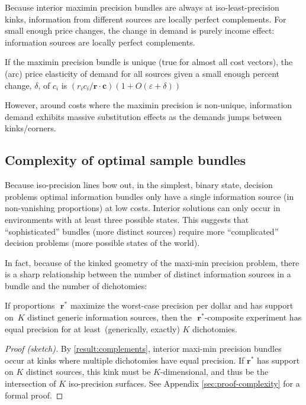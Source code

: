 \documentclass{fancyArticle}
\renewcommand{\|}{\,|\,}                    %
\providecommand{\;}{\,;}                    %
\begin{document}
Because interior maximin precision bundles are always at iso-least-precision kinks, information from different sources are locally perfect complements.
For small enough price changes, the change in demand is purely income effect: information sources are locally perfect complements.
\begin{corollary*}
  If the maximin precision bundle is unique (true for almost all cost vectors), the (arc) price elasticity of demand for all sources given a small enough percent change, $\delta$, of $c_i$ is
  $( r_{i}c_i / \mathbf{r} \cdot \mathbf{c} )\left( 1 + O \left( \varepsilon + \delta \right) \right)$
\end{corollary*}
However, around costs where the maximin precision is non-unique, information demand exhibits massive substitution effects as the demands jumps between kinks/corners.


\subsection{Complexity of optimal sample bundles}
\label{sec:complex-bundles}

Because iso-precision lines bow out, in the simplest, binary state, decision problems optimal information bundles only have a single information source (in non-vanishing proportions) at low costs.
Interior solutions can only occur in environments with at least three possible states.
This suggests that ``sophisticated'' bundles (more distinct sources) require more ``complicated'' decision problems (more possible states of the world).

In fact, because of the kinked geometry of the maxi-min precision problem,  there is a sharp relationship between the number of distinct information sources in a bundle and the number of dichotomies:

\begin{proposition}\label{result:complexity}
  If proportions\ \,$\mathbf{r}^{*}$ maximize the worst-case precision per dollar and has support on\ $K$ distinct generic information sources, then the\ \,$\mathbf{r}^{*}$-composite experiment has equal precision for at least\ (generically, exactly) $K$ dichotomies.
\end{proposition}

\begin{proof}[Proof (sketch)]
  By \autoref{result:complements}, interior maxi-min precision bundles occur at kinks where multiple dichotomies have equal precision.
  If $\mathbf{r}^{*}$ has support on $K$ distinct sources, this kink must be $K$-dimensional, and thus be the intersection of $K$ iso-precision surfaces.
  See Appendix \ref{sec:proof-complexity} for a formal proof.
  \renewcommand{\qedsymbol}{ }
\end{proof}
\end{document}
